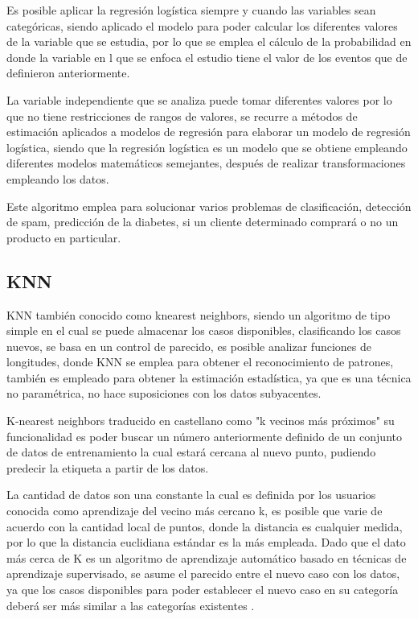 Es posible aplicar la regresión logística siempre y cuando las variables sean categóricas, siendo aplicado el modelo para poder calcular los diferentes valores de la variable que se estudia, por lo que se emplea el cálculo de la probabilidad en donde la variable en l que se enfoca el estudio tiene el valor de los eventos que de definieron anteriormente.

La variable independiente que se analiza puede tomar diferentes valores por lo que no tiene restricciones de rangos de valores, se recurre a métodos de estimación aplicados a modelos de regresión para elaborar un modelo de regresión logística, siendo que la regresión logística es un modelo que se obtiene empleando diferentes modelos matemáticos semejantes, después de realizar transformaciones empleando los datos.

Este algoritmo emplea para solucionar varios problemas de clasificación, detección de spam, predicción de la diabetes, si un cliente determinado comprará o no un producto en particular.

\subsection{KNN}

KNN también conocido como knearest neighbors, siendo un algoritmo de tipo simple en el cual se puede almacenar los casos disponibles, clasificando los casos nuevos, se basa en un control de parecido, es posible analizar funciones de longitudes, donde KNN se emplea para obtener el reconocimiento de patrones, también es empleado para obtener la estimación estadística, ya que es una técnica no paramétrica, no hace suposiciones con los datos subyacentes.

K-nearest neighbors traducido en castellano como "k vecinos más próximos" su funcionalidad es poder buscar un número anteriormente definido de un conjunto de datos de entrenamiento la cual estará cercana al nuevo punto, pudiendo predecir la etiqueta a partir de los datos.


La cantidad de datos son una constante la cual es definida por los usuarios conocida como aprendizaje del vecino más cercano k, es posible que varie de acuerdo con la cantidad local de puntos, donde la distancia es cualquier medida, por lo que la distancia euclidiana estándar es la más empleada.
Dado que el dato más cerca de K es un algoritmo de aprendizaje automático basado en  técnicas de aprendizaje supervisado, se asume el parecido entre el nuevo caso con los datos, ya que los casos disponibles para poder establecer el nuevo caso en su categoría deberá ser más similar a las categorías existentes \cite{JimenezLeon2021}.


